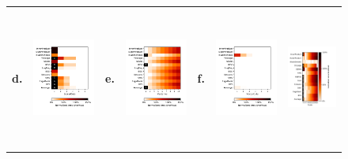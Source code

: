 \begin{figure}
\begin{tabular}{p{0.01cm} p{4.6cm} p{0.01cm} p{4.6cm} p{0.01cm} p{4.6cm} p{0.9cm}}
\textbf{d.} & {\includegraphics[clip, trim=0.4cm 3.31cm 1.0cm 1.2cm, width=4.6cm]{figs/ScalarOuts.pdf}} &
\textbf{e.} & {\includegraphics[clip, trim=0.4cm 3.31cm 1.0cm 1.2cm, width=4.6cm]{figs/VectorIns.pdf}} &
\textbf{f.} & {\includegraphics[clip, trim=0.4cm 3.31cm 1.0cm 1.2cm, width=4.6cm]{figs/VectorOuts.pdf}} &
{\includegraphics[clip, trim=6.4cm 0.4cm 0.4cm 0.4cm, height=4.6cm]{figs/Scale.pdf}} \\


\end{tabular}
\end{figure}
